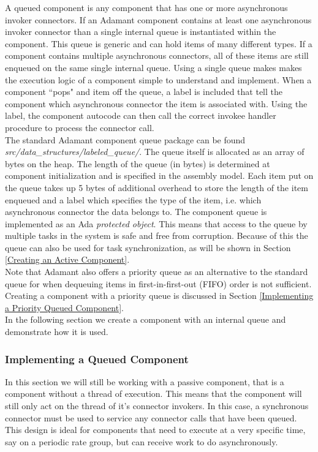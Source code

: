 A queued component is any component that has one or more asynchronous invoker connectors. If an Adamant component contains at least one asynchronous invoker connector than a single internal queue is instantiated within the component. This queue is generic and can hold items of many different types. If a component contains multiple asynchronous connectors, all of these items are still enqueued on the same single internal queue. Using a single queue makes makes the execution logic of a component simple to understand and implement. When a component ``pops" and item off the queue, a label is included that tell the component which asynchronous connector the item is associated with. Using the label, the component autocode can then call the correct invokee handler procedure to process the connector call. \\

The standard Adamant component queue package can be found \textit{src/data\_structures/labeled\_queue/}. The queue itself is allocated as an array of bytes on the heap. The length of the queue (in bytes) is determined at component initialization and is specified in the assembly model. Each item put on the queue takes up 5 bytes of additional overhead to store the length of the item enqueued and a label which specifies the type of the item, i.e. which asynchronous connector the data belongs to. The component queue is implemented as an Ada \textit{protected object}. This means that access to the queue by multiple tasks in the system is safe and free from corruption. Because of this the queue can also be used for task synchronization, as will be shown in Section \ref{Creating an Active Component}. \\

Note that Adamant also offers a priority queue as an alternative to the standard queue for when dequeuing items in first-in-first-out (FIFO) order is not sufficient. Creating a component with a priority queue is discussed in Section \ref{Implementing a Priority Queued Component}. \\

In the following section we create a component with an internal queue and demonstrate how it is used.

\subsubsection{Implementing a Queued Component} \label{Implementing a Queued Component}

In this section we will still be working with a passive component, that is a component without a thread of execution. This means that the component will still only act on the thread of it's connector invokers. In this case, a synchronous connector must be used to service any connector calls that have been queued. This design is ideal for components that need to execute at a very specific time, say on a periodic rate group, but can receive work to do asynchronously. \\

